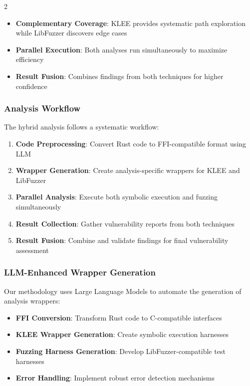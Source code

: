 \documentclass[12pt,a4paper]{article}
\begin{document}
\begin{multicols}{2}
\begin{itemize}
    \item \textbf{Complementary Coverage}: KLEE provides systematic path exploration while LibFuzzer discovers edge cases
    \item \textbf{Parallel Execution}: Both analyses run simultaneously to maximize efficiency
    \item \textbf{Result Fusion}: Combines findings from both techniques for higher confidence
\end{itemize}

\subsubsection{Analysis Workflow}

The hybrid analysis follows a systematic workflow:

\begin{enumerate}
    \item \textbf{Code Preprocessing}: Convert Rust code to FFI-compatible format using LLM
    \item \textbf{Wrapper Generation}: Create analysis-specific wrappers for KLEE and LibFuzzer
    \item \textbf{Parallel Analysis}: Execute both symbolic execution and fuzzing simultaneously
    \item \textbf{Result Collection}: Gather vulnerability reports from both techniques
    \item \textbf{Result Fusion}: Combine and validate findings for final vulnerability assessment
\end{enumerate}

\subsubsection{LLM-Enhanced Wrapper Generation}

Our methodology uses Large Language Models to automate the generation of analysis wrappers:

\begin{itemize}
    \item \textbf{FFI Conversion}: Transform Rust code to C-compatible interfaces
    \item \textbf{KLEE Wrapper Generation}: Create symbolic execution harnesses
    \item \textbf{Fuzzing Harness Generation}: Develop LibFuzzer-compatible test harnesses
    \item \textbf{Error Handling}: Implement robust error detection mechanisms
\end{itemize}


\end{multicols}
\end{document}
